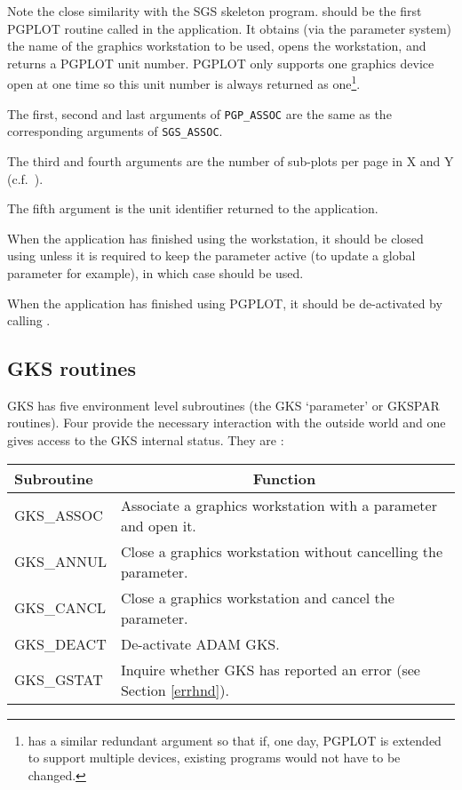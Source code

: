 Note the close similarity with the SGS skeleton program. 
 should be
the first PGPLOT routine called in the application. It obtains (via the
parameter system) the name of the graphics workstation  to be used, opens the
workstation, and returns a PGPLOT unit number. PGPLOT only supports one
graphics device open at one time so this unit number is always returned as
one\footnote{ has a similar redundant argument so that if, one day,
PGPLOT is extended to support multiple devices, existing programs would not
have to be changed.}.

The first, second and last arguments of {\tt PGP\_ASSOC} are the same as the
corresponding arguments of {\tt SGS\_ASSOC}.

The third and fourth arguments are the number of sub-plots per page in X and Y
(c.f.\ ).

The fifth argument is the unit identifier returned to the application.

When the application has finished using the workstation, it should be closed
using 
unless it is required to keep the parameter active 
(to update a global parameter for example), in which case 
 should be used.

When the application has finished using PGPLOT, it should be de-activated by
calling .

\subsection{GKS routines}

GKS has five environment level subroutines (the GKS `parameter' or GKSPAR
routines). Four provide the necessary interaction with the outside world
and one gives access to the GKS internal status.
They are :

\begin{center}
\begin{tabular}{||l|l||} \hline
Subroutine & \multicolumn{1}{c||}{Function} \\ \hline
GKS\_ASSOC  & Associate a graphics workstation with a parameter and open it.\\
GKS\_ANNUL  & Close a graphics workstation without cancelling the parameter.\\
GKS\_CANCL  & Close a graphics workstation and cancel the parameter.\\
GKS\_DEACT  & De-activate ADAM GKS.\\ 
GKS\_GSTAT  & Inquire whether GKS has reported an error 
(see Section \ref{errhnd}). \\ \hline
\end{tabular}
\end{center}

